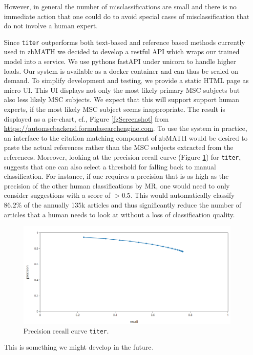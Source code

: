 However, in general the number of misclassifications are small and there is no immediate action that one could do to avoid special cases of misclassification that do not involve a human expert.


Since \texttt{titer} outperforms both text-based and reference based methods currently used in zbMATH we decided to develop a restful API which wraps our trained model into a service.
We use pythons fastAPI under unicorn to handle higher loads.
Our system is available as a docker container and can thus be scaled on demand.
To simplify development and testing, we provide a static HTML page as micro UI.
This UI displays not only the most likely primary MSC subjects but also less likely MSC subjects.
We expect that this will support support human experts, if the most likely MSC subject seems inappropriate.
The result is displayed as a pie-chart, cf., Figure \ref{fgScreenshot} from
\url{https://automscbackend.formulasearchengine.com}.
To use the system in practice, an interface to the citation matching component of zbMATH would be desired to paste the actual references rather than the MSC subjects extracted from the references.
Moreover, looking at the precision recall curve (Figure \ref{fgPR}) for \texttt{titer}, suggests that one can also select a threshold for falling back to manual classification.
For instance, if one requires a precision that is as high as the precision of the other human classifications by MR, one would need to only consider suggestions with a score of $>0.5$. 
This would automatically classify $86.2\%$ of the annually 135k articles and thus significantly reduce the number of articles that a human needs to look at without a loss of classification quality.

\begin{figure}[t]
  \centering
  \includegraphics[width=.7\textwidth]{prcurve.png}
  \caption{Precision recall curve \texttt{titer}.}
  \label{fgPR}
\end{figure}
This is something we might develop in the future.


